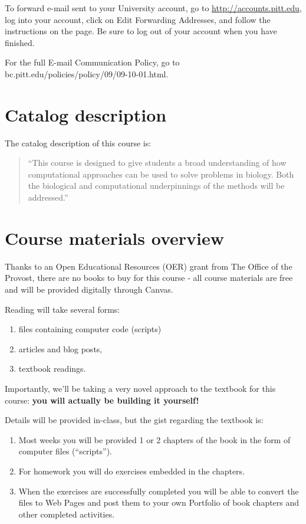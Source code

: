 \documentclass[
]{book}
\providecommand{\tightlist}{%
  \setlength{\itemsep}{0pt}\setlength{\parskip}{0pt}}
\begin{document}
To forward e-mail sent to your University account, go to \url{http://accounts.pitt.edu}, log into your account, click on Edit Forwarding Addresses, and follow the instructions on the page. Be sure to log out of your account when you have finished.

For the full E-mail Communication Policy, go to bc.pitt.edu/policies/policy/09/09-10-01.html.

\hypertarget{catalog-description}{%
\chapter{Catalog description}\label{catalog-description}}

The catalog description of this course is:

\begin{quote}
``This course is designed to give students a broad understanding of how computational approaches can be used to solve problems in biology. Both the biological and computational underpinnings of the methods will be addressed.''
\end{quote}

\hypertarget{course-materials-overview}{%
\chapter{Course materials overview}\label{course-materials-overview}}

Thanks to an Open Educational Resources (OER) grant from The Office of the Provost, there are no books to buy for this course - all course materials are free and will be provided digitally through Canvas.

Reading will take several forms:

\begin{enumerate}
\def\labelenumi{\arabic{enumi}.}
\tightlist
\item
  files containing computer code (scripts)
\item
  articles and blog posts,
\item
  textbook readings.
\end{enumerate}

Importantly, we'll be taking a very novel approach to the textbook for this course: \textbf{you will actually be building it yourself!}

Details will be provided in-class, but the gist regarding the textbook is:

\begin{enumerate}
\def\labelenumi{\arabic{enumi}.}
\tightlist
\item
  Most weeks you will be provided 1 or 2 chapters of the book in the form of computer files (``scripts'').
\item
  For homework you will do exercises embedded in the chapters.
\item
  When the exercises are successfully completed you will be able to convert the files to Web Pages and post them to your own Portfolio of book chapters and other completed activities.
\end{enumerate}
\end{document}
